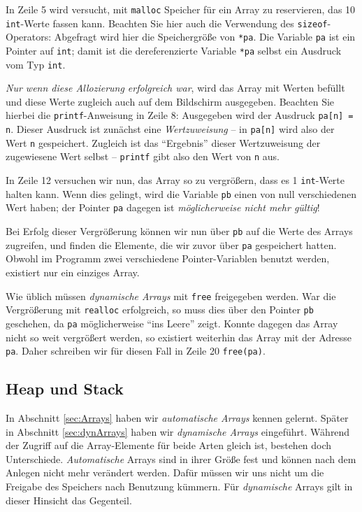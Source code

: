 In Zeile 5 wird versucht, mit \texttt{malloc} Speicher für ein Array zu reservieren, das 10 \texttt{int}-Werte fassen kann. Beachten Sie hier auch die Verwendung des \texttt{sizeof}-Operators: Abgefragt wird hier die Speichergröße von \texttt{*pa}. Die Variable \texttt{pa} ist ein Pointer auf \texttt{int}; damit ist die dereferenzierte Variable \texttt{*pa} selbst ein Ausdruck vom Typ \texttt{int}.

\emph{Nur wenn diese Allozierung erfolgreich war}, wird das Array mit Werten befüllt und diese Werte zugleich auch auf dem Bildschirm ausgegeben. Beachten Sie hierbei die \texttt{printf}-Anweisung in Zeile 8: Ausgegeben wird der Ausdruck \texttt{pa[n] = n}. Dieser Ausdruck ist zunächst eine \emph{Wertzuweisung} -- in \texttt{pa[n]} wird also der Wert \texttt{n} gespeichert. Zugleich ist das \enquote{Ergebnis} dieser Wertzuweisung der zugewiesene Wert selbst -- \texttt{printf} gibt also den Wert von \texttt{n} aus.

In Zeile 12 versuchen wir nun, das Array so zu vergrößern, dass es \mbox{1} \texttt{int}-Werte halten kann. Wenn dies gelingt, wird die Variable \texttt{pb} einen von null verschiedenen Wert haben; der Pointer \texttt{pa} dagegen ist \emph{möglicherweise nicht mehr gültig}!

Bei Erfolg dieser Vergrößerung können wir nun über \texttt{pb} auf die Werte des Arrays zugreifen, und finden die Elemente, die wir zuvor über \texttt{pa} gespeichert hatten. Obwohl im Programm zwei verschiedene Pointer-Variablen benutzt werden, existiert nur ein einziges Array.

Wie üblich müssen \emph{dynamische Arrays} mit \texttt{free} freigegeben werden. War die Vergrößerung mit \texttt{realloc} erfolgreich, so muss dies über den Pointer \texttt{pb} geschehen, da \texttt{pa} möglicherweise \enquote{ins Leere} zeigt. Konnte dagegen das Array nicht so weit vergrößert werden, so existiert weiterhin das Array mit der Adresse \texttt{pa}. Daher schreiben wir für diesen Fall in Zeile 20 \texttt{free(pa)}.

\subsection{Heap und Stack} \label{sec:HeapStack}
In Abschnitt \ref{sec:Arrays} haben wir \emph{automatische Arrays} kennen gelernt. Später in Abschnitt \ref{sec:dynArrays} haben wir \emph{dynamische Arrays} eingeführt. Während der Zugriff auf die Array-Elemente für beide Arten gleich ist, bestehen doch Unterschiede. \emph{Automatische} Arrays sind in ihrer Größe fest und können nach dem Anlegen nicht mehr verändert werden. Dafür müssen wir uns nicht um die Freigabe des Speichers nach Benutzung kümmern. Für \emph{dynamische} Arrays gilt in dieser Hinsicht das Gegenteil.

